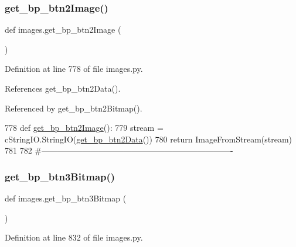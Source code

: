 \mbox{\label{namespaceimages_ada672f222565a1316fb9e187f9647f6a}} 
\subsubsection{\texorpdfstring{get\+\_\+bp\+\_\+btn2\+Image()}{get\_bp\_btn2Image()}}
{\footnotesize\ttfamily def images.\+get\+\_\+bp\+\_\+btn2\+Image (\begin{DoxyParamCaption}{ }\end{DoxyParamCaption})}



Definition at line 778 of file images.\+py.



References get\+\_\+bp\+\_\+btn2\+Data().



Referenced by get\+\_\+bp\+\_\+btn2\+Bitmap().


\begin{DoxyCode}
778 \textcolor{keyword}{def }\hyperlink{namespaceimages_ada672f222565a1316fb9e187f9647f6a}{get\_bp\_btn2Image}():
779     stream = cStringIO.StringIO(\hyperlink{namespaceimages_a2ce23ab5c8c0b632222e3dc118dbd0af}{get\_bp\_btn2Data}())
780     \textcolor{keywordflow}{return} ImageFromStream(stream)
781 
782 \textcolor{comment}{#----------------------------------------------------------------------}
\end{DoxyCode}
\mbox{\label{namespaceimages_a4f4cb6eb620070ef37c962ae6c43c418}} 
\subsubsection{\texorpdfstring{get\+\_\+bp\+\_\+btn3\+Bitmap()}{get\_bp\_btn3Bitmap()}}
{\footnotesize\ttfamily def images.\+get\+\_\+bp\+\_\+btn3\+Bitmap (\begin{DoxyParamCaption}{ }\end{DoxyParamCaption})}



Definition at line 832 of file images.\+py.



